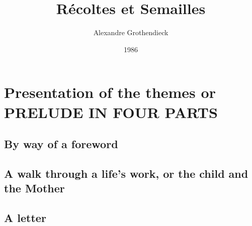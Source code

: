 \documentclass{book}
\begin{document}
\title{R\'ecoltes et Semailles}
\author{Alexandre Grothendieck}
\date{1986}
\maketitle
\tableofcontents

\part*{Presentation of the themes or PRELUDE IN FOUR PARTS}

\chapter{By way of a foreword}


\chapter{A walk through a life's work, or the child and the Mother}




\chapter{A letter}


%
%
%

\end{document}
